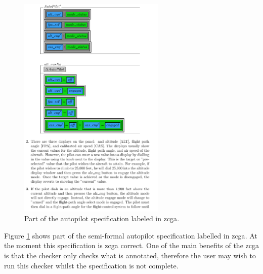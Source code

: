\begin{figure}[H]
\begin{minipage}{0.45\textwidth}
 \includegraphics[width=7cm]{Figures/fullexample/semiform1b.png}
 \end{minipage}
 \caption{Part of the autopilot specification labeled in \gls{zcga}.\label{fig:zcgaschemasemiform}}
 \end{figure}

Figure \ref{fig:zcgaschemasemiform} shows part of the semi-formal autopilot
specification labelled in \gls{zcga}. At the moment this specification is
\gls{zcga} correct. One of the main benefits of the \gls{zcga} is that the
checker only checks what is annotated, therefore the user may wish to run this
checker whilst the specification is not complete.

